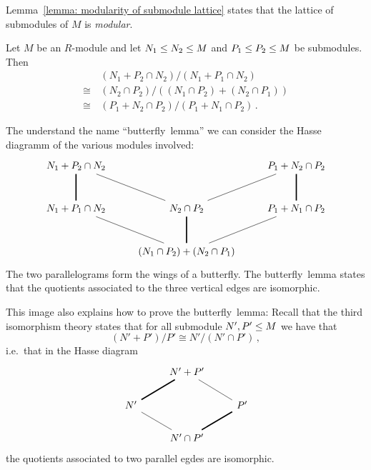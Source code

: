 \begin{remark}
  Lemma~\ref{lemma: modularity of submodule lattice} states that the lattice of submodules of $M$ is \emph{modular}.
\end{remark}



\begin{lemma}
  \label{lemma: butterfly lemma}
  Let $M$ be an $R$-module and let $N_1 \leq N_2 \leq M$ and $P_1 \leq P_2 \leq M$ be submodules.
  Then
  \begin{align*}
         &\,  (N_1 + P_2 \cap N_2)/(N_1 + P_1 \cap N_2)         \\
    \cong&\,  (N_2 \cap P_2)/((N_1 \cap P_2) + (N_2 \cap P_1))  \\
    \cong&\,  (P_1 + N_2 \cap P_2)/(P_1 + N_1 \cap P_2) \,.
  \end{align*}
\end{lemma}


\begin{fluff}
  The understand the name \enquote{butterfly~lemma} we can consider the Hasse diagramm of the various modules involved:
  \[
    \begin{tikzcd}[row sep = large]
        N_1 + P_2 \cap N_2
      & {}
      & P_1 + N_2 \cap P_2
      \\
        N_1 + P_1 \cap N_2
        \arrow[-, very thick]{u}
      & N_2 \cap P_2
        \arrow[-]{lu}
        \arrow[-]{ru}
      & P_1 + N_1 \cap P_2
        \arrow[-, very thick]{u}
      \\
        {}
      & (N_1 \cap P_2) + (N_2 \cap P_1)
        \arrow[-]{lu}
        \arrow[-, very thick]{u}
        \arrow[-]{ru}
      & {}
    \end{tikzcd}
  \]
  The two parallelograms form the wings of a butterfly.
  The butterfly~lemma states that the quotients associated to the three vertical edges are isomorphic.
  
  This image also explains how to prove the butterfly~lemma:
  Recall that the third isomorphism theory states that for all submodule $N', P' \leq M$ we have that
  \[
          (N' + P')/P'
    \cong N'/(N' \cap P') \,,
  \]
  i.e.\ that in the Hasse diagram
  \[
    \begin{tikzcd}
        {}
      & N' + P'
      & {}
      \\
        N'
        \arrow[-,very thick]{ru}
      & {}
      & P'
        \arrow[-]{lu}
      \\
        {}
      & N' \cap P'
        \arrow[-]{lu}
        \arrow[-,very thick]{ru}
      & {}
    \end{tikzcd}
  \]
  the quotients associated to two parallel egdes are isomorphic.
\end{fluff}


